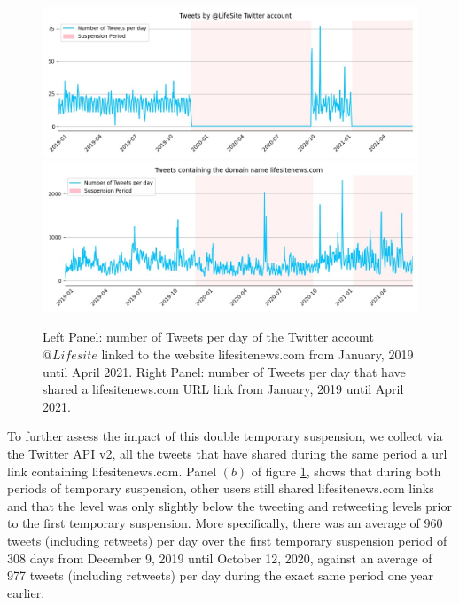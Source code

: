 \documentclass{article}
\begin{document}
\begin{figure}[h]
\centering
		\includegraphics[scale=0.27]{../figure/lifesite.jpg} 
		\includegraphics[scale=0.27]{../figure/lifesite_domain.jpg}
\caption{Left Panel: number of Tweets per day of the Twitter account $@Lifesite$ linked to the website lifesitenews.com from January, 2019 until April 2021. Right Panel: number of Tweets per day that have shared a lifesitenews.com URL link from January, 2019 until April 2021. }
\label{fig2}
\end{figure}

To further assess the impact of this double temporary suspension, we collect via the Twitter API v2, all the tweets that have shared during the same period a url link containing lifesitenews.com. Panel $(b)$ of figure \ref{fig2}, shows that during both periods of temporary suspension, other users still shared lifesitenews.com links and that the level was only slightly below the tweeting and retweeting levels prior to the first temporary suspension. More specifically, there was an average of 960 tweets (including retweets) per day over the first temporary suspension period of 308 days from December 9, 2019 until October 12, 2020, against an average of 977 tweets (including retweets) per day during the exact same period one year earlier. 
\end{document}
